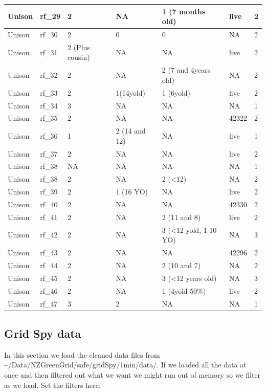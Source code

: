 \documentclass[]{article}
\begin{document}
\begin{table}
\begin{tabular}[t]{l|l|l|l|l|l|l}
\hline
Unison & rf\_29 & 2 & NA & 1 (7 months old) & live & 2\\
\hline
Unison & rf\_30 & 2 & 0 & 0 & NA & 2\\
\hline
Unison & rf\_31 & 2 (Plus cousin) & NA & NA & live & 2\\
\hline
Unison & rf\_32 & 2 & NA & 2 (7 and 4years old) & NA & 2\\
\hline
Unison & rf\_33 & 2 & 1(14yold) & 1 (6yold) & live & 2\\
\hline
Unison & rf\_34 & 3 & NA & NA & NA & 1\\
\hline
Unison & rf\_35 & 2 & NA & NA & 42322 & 2\\
\hline
Unison & rf\_36 & 1 & 2 (14 and 12) & NA & live & 1\\
\hline
Unison & rf\_37 & 2 & NA & NA & live & 2\\
\hline
Unison & rf\_38 & NA & NA & NA & NA & 1\\
\hline
Unison & rf\_38 & 2 & NA & 2 (<12) & NA & 2\\
\hline
Unison & rf\_39 & 2 & 1 (16 YO) & NA & live & 2\\
\hline
Unison & rf\_40 & 2 & NA & NA & 42330 & 2\\
\hline
Unison & rf\_41 & 2 & NA & 2 (11 and 8) & live & 2\\
\hline
Unison & rf\_42 & 2 & NA & 3 (<12 yold, 1 10 YO) & NA & 3\\
\hline
Unison & rf\_43 & 2 & NA & NA & 42296 & 2\\
\hline
Unison & rf\_44 & 2 & NA & 2 (10 and 7) & NA & 2\\
\hline
Unison & rf\_45 & 2 & NA & 3 (<12 years old) & NA & 3\\
\hline
Unison & rf\_46 & 2 & NA & 1 (4yold-50\%) & live & 2\\
\hline
Unison & rf\_47 & 3 & 2 & NA & NA & 1\\
\hline
\end{tabular}
\end{table}

\subsection{Grid Spy data}\label{grid-spy-data}

In this section we load the cleaned data files from
\textasciitilde{}/Data/NZGreenGrid/safe/gridSpy/1min/data/. If we loaded
all the data at once and then filtered out what we want we might run out
of memory so we filter as we load. Set the filters here:
\end{document}
